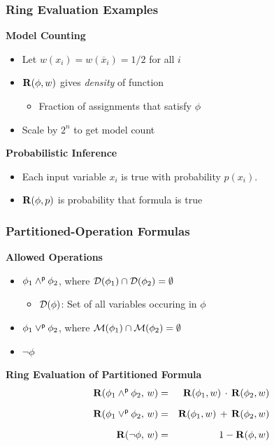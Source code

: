 \documentclass[t,pdf]{beamer}
\newcommand{\obar}[1]{\overline{#1}}
\newcommand{\bitem}{\item[$\bullet$]}
\newcommand{\pand}{\mathbin{\land^{\sf p}}}
\newcommand{\por}{\mathbin{\lor^{\sf p}}}
\begin{document}
\begin{frame}
\frametitle{Ring Evaluation Examples}

\bigskip

{\bf Model Counting}
\begin{itemize}
\item Let $w(x_i) = w(\obar{x}_i) = 1/2$ for all $i$
\item ${\bf R}(\phi, w)$ gives {\em density} of function
  \begin{itemize}
    \bitem Fraction of assignments that satisfy $\phi$
  \end{itemize}
\item Scale by $2^n$ to get model count
\end{itemize}

\bigskip

{\bf Probabilistic Inference}
\begin{itemize}
\item Each input variable $x_i$ is true with probability $p(x_i)$.
\item ${\bf R}(\phi, p)$ is probability that formula is true
\end{itemize}
\end{frame}

\begin{frame}
  \frametitle{Partitioned-Operation Formulas}

\medskip

  {\bf Allowed Operations}
\smallskip
  \begin{itemize}
  \item {} $\phi_1 \pand \phi_2$, where ${\cal D}(\phi_1) \cap {\cal D}(\phi_2) = \emptyset$
\smallskip
    \begin{itemize}
      \bitem ${\cal D}(\phi)$: Set of all variables occuring in $\phi$
    \end{itemize}
\smallskip
  \item {} $\phi_1 \por \phi_2$, where ${\cal M}(\phi_1) \cap {\cal M}(\phi_2) = \emptyset$
\smallskip
  \item {} $\neg \phi$
  \end{itemize}

  \bigskip
      {\bf Ring Evaluation of Partitioned Formula}
      \begin{eqnarray*}
        {\bf R}(\phi_1 \pand \phi_2,\, w) & = & {\bf R}(\phi_1, w) \,\cdot\, {\bf R}(\phi_2, w)\\[1.5ex]
        {\bf R}(\phi_1 \por \phi_2,\, w) & = & {\bf R}(\phi_1, w) \,+\, {\bf R}(\phi_2, w)\\[1.5ex]
        {\bf R}(\neg \phi,\, w) & = & 1-{\bf R}(\phi, w)
      \end{eqnarray*}

\end{frame}
\end{document}
